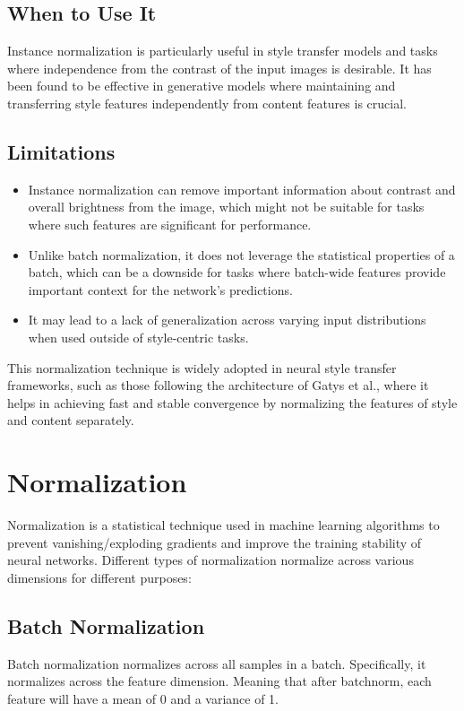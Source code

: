 \documentclass[12pt]{article}
\begin{document}
\subsection{When to Use It}
Instance normalization is particularly useful in style transfer models and tasks where independence from the contrast of the input images is desirable. It has been found to be effective in generative models where maintaining and transferring style features independently from content features is crucial.

\subsection{Limitations}
\begin{itemize}
    \item Instance normalization can remove important information about contrast and overall brightness from the image, which might not be suitable for tasks where such features are significant for performance.
    \item Unlike batch normalization, it does not leverage the statistical properties of a batch, which can be a downside for tasks where batch-wide features provide important context for the network’s predictions.
    \item It may lead to a lack of generalization across varying input distributions when used outside of style-centric tasks.
\end{itemize}

This normalization technique is widely adopted in neural style transfer frameworks, such as those following the architecture of Gatys et al., where it helps in achieving fast and stable convergence by normalizing the features of style and content separately.

\section{Normalization}
Normalization is a statistical technique used in machine learning algorithms to prevent vanishing/exploding gradients and improve the training stability of neural networks. Different types of normalization normalize across various dimensions for different purposes:

\subsection{Batch Normalization}
Batch normalization normalizes across all samples in a batch. Specifically, it normalizes across the feature dimension. Meaning that after batchnorm, each feature will have a mean of 0 and a variance of 1. 
\end{document}
